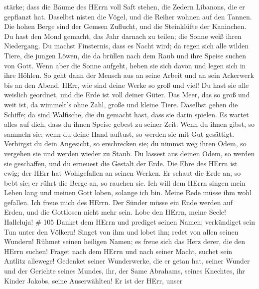 stärke;  dass die Bäume des HErrn voll Saft stehen, die
Zedern Libanons, die er gepflanzt hat.  Daselbst nisten die
Vögel, und die Reiher wohnen auf den Tannen.  Die hohen
Berge sind der Gemsen Zuflucht, und die Steinklüfte der Kaninchen.
 Du hast den Mond gemacht, das Jahr darnach zu teilen; die
Sonne weiß ihren Niedergang.  Du machst Finsternis, dass es
Nacht wird; da regen sich alle wilden Tiere,  die jungen
Löwen, die da brüllen nach dem Raub und ihre Speise suchen von Gott.
 Wenn aber die Sonne aufgeht, heben sie sich davon und
legen sich in ihre Höhlen.  So geht dann der Mensch aus an
seine Arbeit und an sein Ackerwerk bis an den Abend.  HErr,
wie sind deine Werke so groß und viel! Du hast sie alle weislich
geordnet, und die Erde ist voll deiner Güter.  Das Meer,
das so groß und weit ist, da wimmelt's ohne Zahl, große und kleine
Tiere.  Daselbst gehen die Schiffe; da sind Walfische, die
du gemacht hast, dass sie darin spielen.  Es wartet alles
auf dich, dass du ihnen Speise gebest zu seiner Zeit.  Wenn
du ihnen gibst, so sammeln sie; wenn du deine Hand auftust, so werden
sie mit Gut gesättigt.  Verbirgst du dein Angesicht, so
erschrecken sie; du nimmst weg ihren Odem, so vergehen sie und werden
wieder zu Staub.  Du lässest aus deinen Odem, so werden sie
geschaffen, und du erneuest die Gestalt der Erde.  Die Ehre
des HErrn ist ewig; der HErr hat Wohlgefallen an seinen Werken.
 Er schaut die Erde an, so bebt sie; er rührt die Berge an,
so rauchen sie.  Ich will dem HErrn singen mein Leben lang
und meinen Gott loben, solange ich bin.  Meine Rede müsse
ihm wohl gefallen. Ich freue mich des HErrn.  Der Sünder
müsse ein Ende werden auf Erden, und die Gottlosen nicht mehr sein. Lobe
den HErrn, meine Seele! Halleluja! \# 105  Danket dem HErrn
und prediget seinen Namen; verkündiget sein Tun unter den Völkern!
 Singet von ihm und lobet ihn; redet von allen seinen
Wundern!  Rühmet seinen heiligen Namen; es freue sich das
Herz derer, die den HErrn suchen!  Fraget nach dem HErrn und
nach seiner Macht, suchet sein Antlitz allewege!  Gedenket
seiner Wunderwerke, die er getan hat, seiner Wunder und der Gerichte
seines Mundes,  ihr, der Same Abrahams, seines Knechtes, ihr
Kinder Jakobs, seine Auserwählten!  Er ist der HErr, unser
